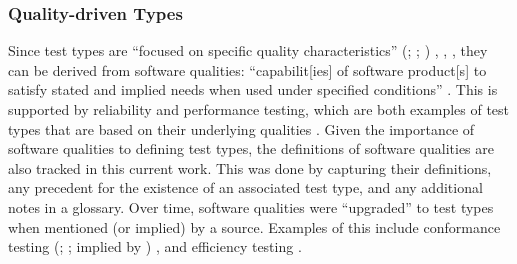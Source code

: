     \subsubsection{Quality-driven Types}
    \label{qual-test}

    Since test types are ``focused on specific quality characteristics''
    \ifnotpaper
        (\citealp[p.~15]{IEEE2022}; \citeyear[p.~7]{IEEE2021};
        \citeyear[p.~473]{IEEE2017})%
    \else
        \cite[p.~15]{IEEE2022}, \cite[p.~7]{IEEE2021}, \cite[p.~473]{IEEE2017}%
    \fi, they can be derived from software qualities: ``capabilit[ies] of
    software product[s] to satisfy stated and implied needs when used under
    specified conditions'' \citep[p.~424]{IEEE2017}. This
    is supported by reliability and performance testing, which are both examples of
    test types \citep{IEEE2022, IEEE2021} that are based on their underlying
    qualities \citep[p.~18]{FentonAndPfleeger1997}.
    Given the importance of software qualities to defining test types, the
    definitions of \qualityCount{} software qualities are also tracked in this
    current work. This was done by capturing their
    definitions, any precedent for the existence of an associated test type,
    and any additional notes in a glossary. Over time, software qualities were
    ``upgraded'' to test types when mentioned (or implied) by a source.
    Examples of this include conformance testing
    \ifnotpaper
        (\citealp[p.~5-7]{SWEBOK2024}; \citealp[p.~25]{JardEtAl1999}; implied
        by \citealp[p.~93]{IEEE2017})
    \else
        \cite[p.~5-7]{SWEBOK2024}, \cite[p.~25]{JardEtAl1999}
    \fi and efficiency testing \citep[p.~44]{Kam2008}.

